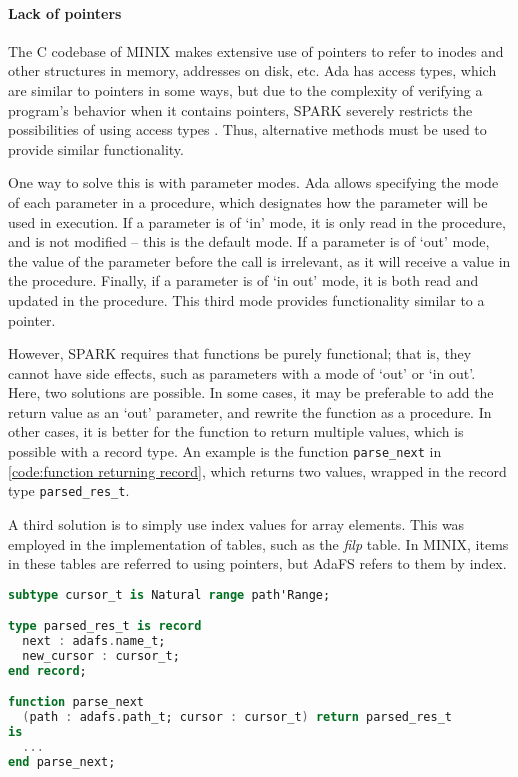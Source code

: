 \paragraph{Lack of pointers}
The C codebase of MINIX makes extensive use of pointers to refer to inodes and other structures in memory, addresses on disk, etc.
Ada has access types, which are similar to pointers in some ways, but due to the complexity of verifying a program's behavior when it contains pointers, SPARK severely restricts the possibilities of using access types \cite{sparkRM}.
Thus, alternative methods must be used to provide similar functionality.

One way to solve this is with parameter modes.
Ada allows specifying the mode of each parameter in a procedure, which designates how the parameter will be used in execution.
If a parameter is of `in' mode, it is only read in the procedure, and is not modified -- this is the default mode.
If a parameter is of `out' mode, the value of the parameter before the call is irrelevant, as it will receive a value in the procedure.
Finally, if a parameter is of `in out' mode, it is both read and updated in the procedure.
This third mode provides functionality similar to a pointer.

However, SPARK requires that functions be purely functional; that is, they cannot have side effects, such as parameters with a mode of `out' or `in out'.
Here, two solutions are possible.
In some cases, it may be preferable to add the return value as an `out' parameter, and rewrite the function as a procedure.
In other cases, it is better for the function to return multiple values, which is possible with a record type.
An example is the function \lstinline[language=Ada]{parse_next} in \autoref{code:function returning record}, which returns two values, wrapped in the record type \lstinline[language=Ada]{parsed_res_t}.

A third solution is to simply use index values for array elements.
This was employed in the implementation of tables, such as the \textit{filp} table.
In MINIX, items in these tables are referred to using pointers, but AdaFS refers to them by index.

\begin{lstlisting}[float=tb,caption={Parse function returning the parsed component and the new cursor position (ellipses denote code omitted for brevity).}, label={code:function returning record}, language=Ada]
subtype cursor_t is Natural range path'Range;

type parsed_res_t is record
  next : adafs.name_t;
  new_cursor : cursor_t;
end record;

function parse_next
  (path : adafs.path_t; cursor : cursor_t) return parsed_res_t
is
  ...
end parse_next;
\end{lstlisting}

